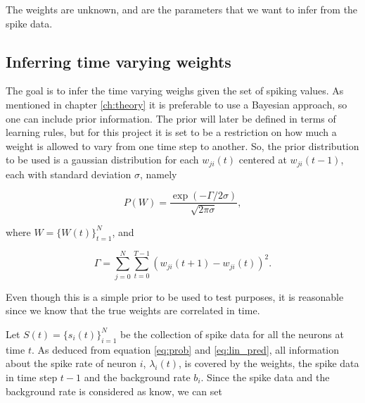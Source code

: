 The weights are unknown, and are the parameters that we want to infer from the spike data. 







\subsection{Inferring time varying weights}
The goal is to infer the time varying weighs given the set of spiking values. As mentioned in chapter \ref{ch:theory} it is preferable to use a Bayesian approach, so one can include prior information. The prior will later be defined in terms of learning rules, but for this project it is set to be a restriction on how much a weight is allowed to vary from one time step to another. So, the prior distribution to be used is a gaussian distribution for each $w_{ji}(t)$ centered at $w_{ji}(t-1)$, each with standard deviation $\sigma$, namely

\begin{equation}
    P(W) = \frac{\exp(-\Gamma /2\sigma)}{\sqrt{2\pi \sigma}},
\end{equation}

where $W=\{W(t)\}_{t=1}^N$, and

\begin{equation}
    \Gamma = \sum_{j=0}^{N} \sum_{t=0}^{T-1} (w_{ji}(t+1)-w_{ji}(t))^2.
\end{equation}

Even though this is a simple prior to be used to test purposes, it is reasonable since we know that the true weights are correlated in time. 

Let $S(t) = \{s_i(t)\}_{i=1}^N$ be the collection of spike data for all the neurons at time $t$. As deduced from equation \ref{eq:prob} and \ref{eq:lin_pred}, all information about the spike rate of neuron $i$, $\lambda_i(t)$, is covered by the weights, the spike data in time step $t-1$ and the background rate $b_i$. Since the spike data and the background rate is considered as know, we can set

